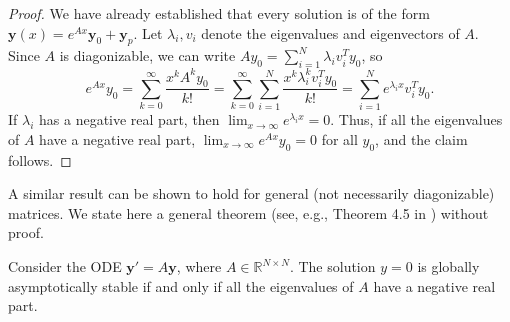 \begin{proof}
    We have already established that every solution is of the form $ \mathbf{y}(x) = e^{Ax} \mathbf{y}_0 + \mathbf{y}_p$. Let $\lambda_i, v_i$ denote the eigenvalues and eigenvectors of $A$. Since $A$ is diagonizable, we can write $A y_0 = \sum_{i=1}^N \lambda_i v_i^T y_0$, so
    \[
e^{Ax}y_0 = \sum_{k=0}^{\infty} \frac{x^k A^k y_0}{k!} = \sum_{k=0}^{\infty}\sum_{i=1}^N \frac{x^k \lambda_i^k v_i^T y_0}{k!} = \sum_{i=1}^N e^{\lambda_i x}v_i^T y_0.
\]
If $\lambda_i$ has a negative real part, then $\lim_{x \to \infty} e^{\lambda_i x} = 0$. Thus, if all the eigenvalues of $A$ have a negative real part, $\lim_{x \to \infty} e^{Ax}y_0 = 0$ for all $y_0$, and the claim follows.
\end{proof}

A similar result can be shown to hold for general (not necessarily diagonizable) matrices. We state here a general theorem (see, e.g., Theorem 4.5 in \cite{khalil2002nonlinear}) without proof.

\begin{theorem}
Consider the ODE $\mathbf{y}' = A \mathbf{y}$, where $A\in \mathbb{R}^{N \times N}$. The solution $y = 0$ is globally asymptotically stable if and only if all the eigenvalues of $A$ have a negative real part.
\end{theorem}
